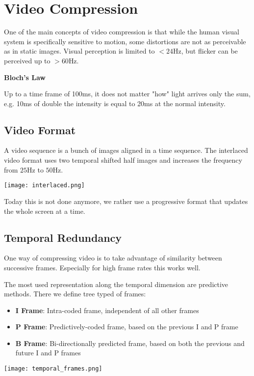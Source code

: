 \section{Video Compression}

One of the main concepts of video compression is that while the human visual system is specifically sensitive to motion, some distortions are not as perceivable as in static images. Visual perception is limited to $<24$Hz, but flicker can be perceived up to $>60$Hz. \medskip

\textbf{Bloch's Law} \smallskip

Up to a time frame of 100ms, it does not matter "how" light arrives only the sum, e.g. 10ms of double the intensity is equal to 20ms at the normal intensity.


\subsection{Video Format}

A video sequence is a bunch of images aligned in a time sequence. The interlaced video format uses two temporal shifted half images and increases the frequency from $25$Hz to $50$Hz. 
\begin{center}
	\texttt{[image: interlaced.png]}
\end{center}

Today this is not done anymore, we rather use a progressive format that updates the whole screen at a time.


\subsection{Temporal Redundancy}

One way of compressing video is to take advantage of similarity between successive frames. Especially for high frame rates this works well. \medskip

The most used representation along the temporal dimension are predictive methods. There we define tree typed of frames:
\begin{itemize}
	\item \textbf{I Frame}: Intra-coded frame, independent of all other frames
	\item \textbf{P Frame}: Predictively-coded frame, based on the previous I and P frame
	\item \textbf{B Frame}: Bi-directionally predicted frame, based on both the previous and future I and P frames
\end{itemize}
\begin{center}
	\texttt{[image: temporal\_frames.png]}
\end{center}

